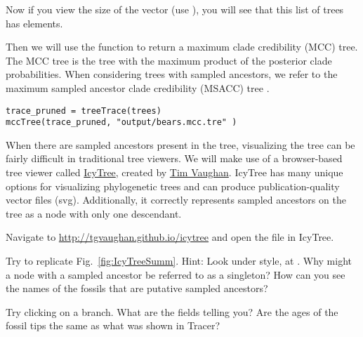 Now if you view the size of the  vector (use ), you will see that this list of trees has  elements.

Then we will use the  function to return a maximum clade credibility (MCC) tree.
The MCC tree is the tree with the maximum product of the posterior clade probabilities.
When considering trees with sampled ancestors, we refer to the maximum sampled ancestor clade credibility (MSACC) tree \citep{Gavryushkina2016}.
{\tt \begin{snugshade*}
\begin{lstlisting}
trace_pruned = treeTrace(trees)
mccTree(trace_pruned, "output/bears.mcc.tre" )
\end{lstlisting}
\end{snugshade*}}


When there are sampled ancestors present in the tree, visualizing the tree can be fairly difficult in traditional tree viewers.
We will make use of a browser-based tree viewer called \href{http://tgvaughan.github.io/icytree/}{IcyTree}, created by \href{https://github.com/tgvaughan}{Tim Vaughan}.
IcyTree has many unique options for visualizing phylogenetic trees and can produce publication-quality vector files (\IE svg). 
Additionally, it correctly represents sampled ancestors on the tree as a node with only one descendant. 

{\begin{framed}
Navigate to \url{http://tgvaughan.github.io/icytree} and open the file  in IcyTree.

Try to replicate Fig.\ \ref{fig:IcyTreeSumm}. Hint: Look under style, at .
Why might a node with a sampled ancestor be referred to as a singleton?
How can you see the names of the fossils that are putative sampled ancestors?

Try clicking on a branch.
What are the fields telling you?
Are the ages of the fossil tips the same as what was shown in Tracer? 
\end{framed}}




\begin{figure}[h!]
\label{fig:IcyTreeScreenshort}
\end{figure}

